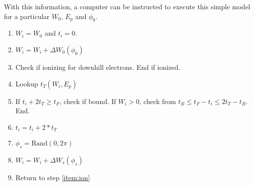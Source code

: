 \documentclass[aps,pra,preprint,groupedaddress]{revtex4-1}
\begin{document}
With this information, a computer can be instructed to execute this simple model for a particular $W_{0}$, $E_p$ and $\phi_0$.
\begin{enumerate}
	\item $W_i = W_{0}$ and $t_i = 0$.
	\item $W_i = W_i + \Delta W_0(\phi_0)$
	\item Check if ionizing for downhill electrons. End if ionized. \label{item:ion}
	\item Lookup $t_T(W_i, E_p)$
	\item If $t_i + 2t_T \geq t_F$, check if bound. If $W_i>0$, check from $t_B \leq t_F - t_i \leq 2 t_T - t_B$. End.
	\item $t_i = t_i + 2*t_T$
	\item $\phi_s = \text{Rand}(0, 2\pi)$
	\item $W_i = W_i + \Delta W_s (\phi_s)$
	\item Return to step \ref{item:ion}
\end{enumerate}
\end{document}

